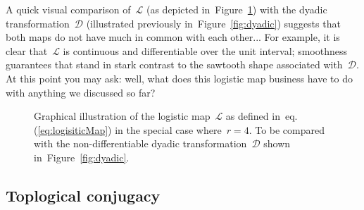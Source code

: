 \documentclass{article}
\begin{document}
\noindent A quick visual comparison of~$\mathcal{L}$ (as depicted in~Figure~\ref{fig:logistic}) with the dyadic transformation~$\mathcal{D}$ (illustrated previously in~Figure~\ref{fig:dyadic}) suggests that both maps do not have much in common with each other...  For example, it is clear that~$\mathcal{L}$ is continuous and differentiable over the unit interval; smoothness guarantees that stand in stark contrast to the sawtooth shape associated with~$\mathcal{D}$. \\

\noindent At this point you may ask: well, what does this logistic map business have to do with anything we discussed so far? \\

\begin{figure}[hb!]
\begin{center}
\end{center} 
\caption{Graphical illustration of the logistic map~$\mathcal{L}$ as defined in~eq.(\ref{eq:logisiticMap}) in the special case where~$r=4$. To be compared with the non-differentiable dyadic transformation~$\mathcal{D}$ shown in~Figure~\ref{fig:dyadic}.}
\label{fig:logistic}
\end{figure}

\subsection{Toplogical conjugacy}
\label{sec:sleight}
\end{document}
